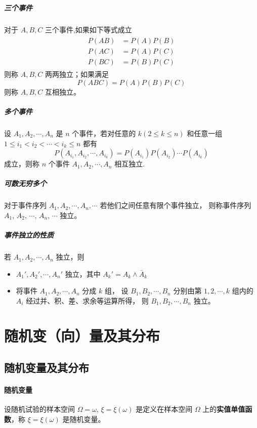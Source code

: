 \subparagraph{三个事件} 对于 $A,B,C$ 三个事件,如果如下等式成立
\begin{align}
    \begin{split}
        P(AB) & = P(A)P(B) \\
        P(AC) & = P(A)P(C) \\
        P(BC) & = P(B)P(C) 
    \end{split}
\end{align}
则称 $A,B,C$ 两两独立；如果满足
\begin{equation}
    P(ABC) = P(A)P(B)P(C)
\end{equation}
则称 $A,B,C$ 互相独立。

\subparagraph{多个事件} 设 $A_1,A_2,\cdots,A_n$ 是 $n$ 个事件，若对任意的 $k(2 \leqslant k \leqslant n)$
和任意一组 $ 1 \leqslant i_1 < i_2 < \cdots < i_k \leqslant n $ 都有
\begin{equation}
    P(A_{i_1}, A_{i_2}, \cdots, A_{i_k}) = P(A_{i_1})P(A_{i_2})\cdots P(A_{i_k})
\end{equation}
成立，则称 $n$ 个事件 $A_1,A_2,\cdots,A_n$ 相互独立.

\subparagraph{可数无穷多个} 对于事件序列 $A_1,A_2,\cdots,A_n,\cdots$ 若他们之间任意有限个事件独立，
则称事件序列 $A_1$, $A_2$, $\cdots$, $A_n$, $\cdots$ 独立。

\subparagraph{事件独立的性质} 若 $A_1,A_2,\cdots,A_n$ 独立，则
\begin{itemize}[leftmargin=\subparitemindent]
    \item $A_1',A_2',\cdots,A_n'$ 独立，其中 $A_k' = A_k \wedge \bar{A}_k $
    \item 将事件 $A_1,A_2,\cdots,A_n$ 分成 $k$ 组，
    设 $B_1,B_2,\cdots,B_n$ 分别由第 $1,2,\cdots,k$ 组内的 $A_i$ 经过并、积、差、求余等运算所得，
    则 $B_1,B_2,\cdots,B_n$ 独立。
\end{itemize}

\section{随机变（向）量及其分布}

\subsection{随机变量及其分布}

\paragraph{随机变量} 设随机试验的样本空间  $ \Omega = {\omega} $, $ \xi = \xi(\omega) $
是定义在样本空间 $ \Omega $ 上的\textbf{实值单值函数}，称 $ \xi = \xi(\omega) $ 是随机变量。

